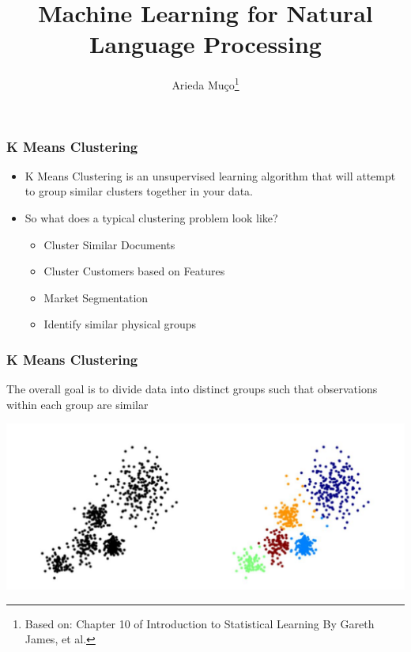 \documentclass[compress, aspectratio=54]{beamer}
\title[Introduction to
K Means Clustering]{Machine Learning for Natural Language Processing}
\author[Arieda Mu\c co]{Arieda Mu\c co\footnote{Based on: Chapter 10 of Introduction to Statistical Learning By Gareth James, et al.}}
\institute[CEU]{Central European University}
\begin{document}
\captionsetup[subfigure]{labelformat=empty}

\frame{\titlepage}



\begin{frame}

\frametitle{K Means Clustering}
\begin{itemize}
\item K Means Clustering is an unsupervised learning algorithm that
will attempt to group similar clusters together in your data.

\item So what does a typical clustering problem look like?
\begin{itemize}
\item Cluster Similar Documents
\item Cluster Customers based on Features
\item Market Segmentation
\item Identify similar physical groups
\end{itemize}
\end{itemize}

\end{frame}

\begin{frame}

\frametitle{K Means Clustering}
The overall goal is to divide data into distinct groups such
that observations within each group are similar

\includegraphics[width=0.85\linewidth ]{Figures/kmeans.png}


\end{frame}



\end{document}
